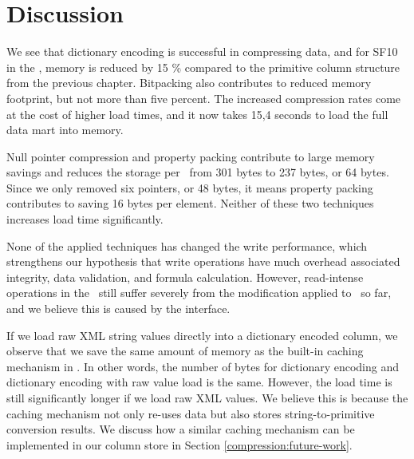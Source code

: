 \section{Discussion}
\label{sec:compression-discussion}
We see that dictionary encoding is successful in compressing data, and for SF10 in the \tpchdl, memory is reduced by 15 \% compared to the primitive column structure from the previous chapter. Bitpacking also contributes to reduced memory footprint, but not more than five percent. The increased compression rates come at the cost of higher load times, and it now takes 15,4 seconds to load the full data mart into memory.

Null pointer compression and property packing contribute to large memory savings and reduces the storage per \lineitem~from 301 bytes to 237 bytes, or 64 bytes. Since we only removed six pointers, or 48 bytes, it means property packing contributes to saving 16 bytes per element. Neither of these two techniques increases load time significantly.

None of the applied techniques has changed the write performance, which strengthens our hypothesis that write operations have much overhead associated integrity, data validation, and formula calculation. However, read-intense operations in the \tpchdl~still suffer severely from the modification applied to \gap~so far, and we believe this is caused by the  interface.

If we load raw XML string values directly into a dictionary encoded column, we observe that we save the same amount of memory as the built-in caching mechanism in \gap. In other words, the number of bytes for dictionary encoding and dictionary encoding with raw value load is the same. However, the load time is still significantly longer if we load raw XML values. We believe this is because the caching mechanism not only re-uses data but also stores string-to-primitive conversion results. We discuss how a similar caching mechanism can be implemented in our column store in Section \ref{compression:future-work}.

